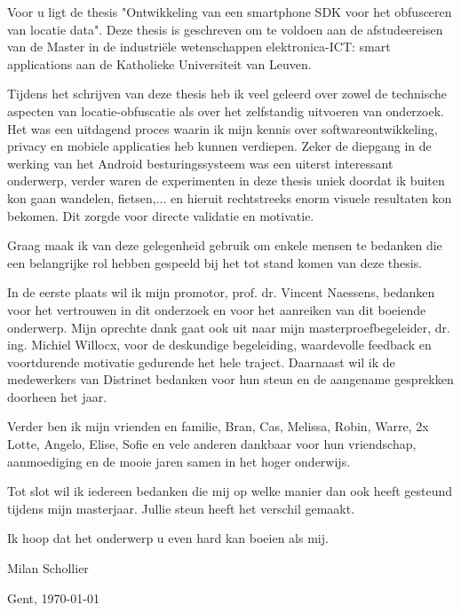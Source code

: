 Voor u ligt de thesis "Ontwikkeling van een smartphone SDK voor het obfusceren van locatie data". Deze thesis is geschreven om te voldoen aan de afstudeereisen van de Master in de
industriële wetenschappen elektronica-ICT:
smart applications aan de Katholieke Universiteit van Leuven.

Tijdens het schrijven van deze thesis heb ik veel geleerd over zowel de technische aspecten van locatie-obfuscatie als over het zelfstandig uitvoeren van onderzoek. Het was een uitdagend proces waarin ik mijn kennis over softwareontwikkeling, privacy en mobiele applicaties heb kunnen verdiepen. Zeker de diepgang in de werking van het Android besturingssysteem was een uiterst interessant onderwerp, verder waren de experimenten in deze thesis uniek doordat ik buiten kon gaan wandelen, fietsen,... en hieruit rechtstreeks enorm visuele resultaten kon bekomen. Dit zorgde voor directe validatie en motivatie.

Graag maak ik van deze gelegenheid gebruik om enkele mensen te bedanken die een belangrijke rol hebben gespeeld bij het tot stand komen van deze thesis.

In de eerste plaats wil ik mijn promotor, prof. dr. Vincent Naessens, bedanken voor het vertrouwen in dit onderzoek en voor het aanreiken van dit boeiende onderwerp. Mijn oprechte dank gaat ook uit naar mijn masterproefbegeleider, dr. ing. Michiel Willocx, voor de deskundige begeleiding, waardevolle feedback en voortdurende motivatie gedurende het hele traject. Daarnaast wil ik de medewerkers van Distrinet bedanken voor hun steun en de aangename gesprekken doorheen het jaar.

Verder ben ik mijn vrienden en familie, Bran, Cas, Melissa, Robin, Warre, 2x Lotte, Angelo, Elise, Sofie en vele anderen dankbaar voor hun vriendschap, aanmoediging en de mooie jaren samen in het hoger onderwijs.

Tot slot wil ik iedereen bedanken die mij op welke manier dan ook heeft gesteund tijdens mijn masterjaar. Jullie steun heeft het verschil gemaakt.

Ik hoop dat het onderwerp u even hard kan boeien als mij.

Milan Schollier

Gent, \today